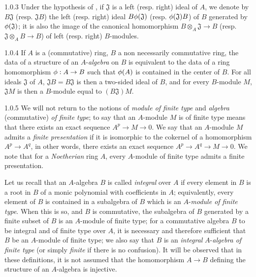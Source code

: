\documentclass[10pt,oneside]{book}
\begin{document}
\begin{env}{1.0.3}
\label{env-0.1.0.3}
Under the hypothesis of , if $\mathfrak{J}$ is a left (resp. right) ideal of $A$, we
denote by $B\mathfrak{J}$ (resp. $\mathfrak{J}B$) the left (resp. right) ideal $B\phi(\mathfrak{J})$
(resp. $\phi(\mathfrak{J})B$) of $B$ generated by $\phi(\mathfrak{J})$; it is also the image
of the canonical homomorphism $B\otimes_A\mathfrak{J}\to B$ (resp. $\mathfrak{J}\otimes_A B\to B$)
of left (resp. right) $B$-modules.
\end{env}

\begin{env}{1.0.4}
\label{env-0.1.0.4}
If $A$ is a (commutative) ring, $B$ a non necessarily commutative ring, the data of
a structure of an $A$-\emph{algebra} on $B$ is equivalent to the data of a ring
homomorphism $\phi:A\to B$ such that $\phi(A)$ is contained in the center of $B$.
For all ideals $\mathfrak{J}$ of $A$, $\mathfrak{J}B=B\mathfrak{J}$ is then a two-sided ideal of $B$, and
for every $B$-module $M$, $\mathfrak{J}M$ is then a $B$-module equal to $(B\mathfrak{J})M$.
\end{env}

\begin{env}{1.0.5}
\label{env-0.1.0.5}
We will not return to the notions of \emph{module of finite type} and \emph{algebra}
(commutative) \emph{of finite type}; to say that an $A$-module $M$ is of finite type means
that there exists
an exact sequence $A^p\to M\to 0$. We say that an $A$-module $M$ admits a \emph{finite
presentation} if it is isomorphic to the cokernel of a homomorphism $A^p\to A^q$, in other
words, there exists an exact sequence $A^p\to A^q\to M\to 0$. We note that for a
\emph{Noetherian} ring $A$, every $A$-module of finite type admits a finite presentation.

Let us recall that an $A$-algebra $B$ is called \emph{integral} over $A$ if every element
in $B$ is a root in $B$ of a monic polynomial with coefficients in $A$; equivalently, every
element of $B$ is contained in a subalgebra of $B$ which is an $A$-\emph{module of finite
type}. When this is so, and $B$ is commutative, the subalgebra of $B$ generated by a finite
subset of $B$ is an $A$-module of finite type; for a commutative algebra $B$ to be integral
and of finite type over $A$, it is necessary and therefore sufficient that $B$ be an
$A$-module of finite type; we also say that $B$ is an \emph{integral} $A$-\emph{algebra of
finite type} (or simply \emph{finite} if there is no confusion). It will be observed that in
these definitions, it is not assumed that the homomorphism $A\to B$ defining the structure of
an $A$-algebra is injective.
\end{env}
\end{document}
